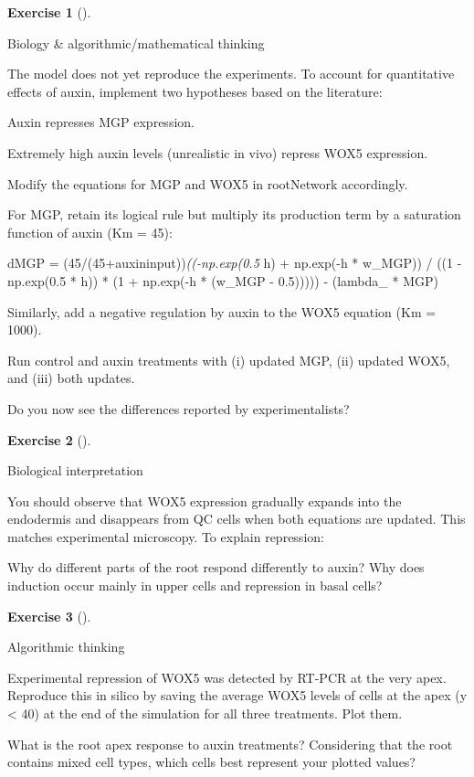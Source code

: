 \documentclass[
  letterpaper,
  DIV=11,
  numbers=noendperiod]{scrreprt}
\theoremstyle{definition}
\newtheorem{exercise}{Exercise}[chapter]
\theoremstyle{remark}
\begin{document}
\begin{exercise}[]\protect\hypertarget{exr-tur}{}\label{exr-tur}

Biology \& algorithmic/mathematical thinking

The model does not yet reproduce the experiments. To account for
quantitative effects of auxin, implement two hypotheses based on the
literature:

Auxin represses MGP expression.

Extremely high auxin levels (unrealistic in vivo) repress WOX5
expression.

Modify the equations for MGP and WOX5 in rootNetwork accordingly.

For MGP, retain its logical rule but multiply its production term by a
saturation function of auxin (Km = 45):

dMGP = (45/(45+auxininput))\emph{((-np.exp(0.5 } h) + np.exp(-h *
w\_MGP)) / ((1 - np.exp(0.5 * h)) * (1 + np.exp(-h * (w\_MGP - 0.5)))))
- (lambda\_ * MGP)

Similarly, add a negative regulation by auxin to the WOX5 equation (Km =
1000).

Run control and auxin treatments with (i) updated MGP, (ii) updated
WOX5, and (iii) both updates.

Do you now see the differences reported by experimentalists?

\end{exercise}

\begin{exercise}[]\protect\hypertarget{exr-tur}{}\label{exr-tur}

Biological interpretation

You should observe that WOX5 expression gradually expands into the
endodermis and disappears from QC cells when both equations are updated.
This matches experimental microscopy. To explain repression:

Why do different parts of the root respond differently to auxin? Why
does induction occur mainly in upper cells and repression in basal
cells?

\end{exercise}

\begin{exercise}[]\protect\hypertarget{exr-tur}{}\label{exr-tur}

Algorithmic thinking

Experimental repression of WOX5 was detected by RT-PCR at the very apex.
Reproduce this in silico by saving the average WOX5 levels of cells at
the apex (y \textless{} 40) at the end of the simulation for all three
treatments. Plot them.

What is the root apex response to auxin treatments? Considering that the
root contains mixed cell types, which cells best represent your plotted
values?

\end{exercise}
\end{document}
